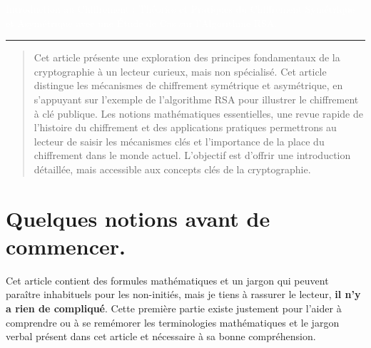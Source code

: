 \documentclass{article}
\author{
	Mathis Lefebvre \\
	\texttt{lefebvremathis@proton.me}\\ \vspace{60pt} 
	\today
	}
\makeatletter
\newenvironment{resume}{%
	\renewcommand{\abstractname}{Résumé}%
	\begin{abstract}
	}{%
	\end{abstract}
}
\def\printauthor{%
	{\large \@author}}
\makeatother
\begin{document}
	
	\begin{titlepage}
		\BgThispage
		\vspace*{2cm}
		\noindent
		\textcolor{white}{\huge Introduction au Chiffrement : Théories et Pratiques du Chiffrement
			Symétrique et Asymétrique avec une Étude de Cas sur l'Algorithme RSA.}
		\vspace*{2.5cm}\par
		\noindent
		\begin{minipage}{0.35\linewidth}
			\begin{flushright}
				\printauthor
			\end{flushright}
		\end{minipage} \hspace{15pt}
		\begin{minipage}{0.02\linewidth}
			\rule{1pt}{175pt}
		\end{minipage} \hspace{-10pt}
		\begin{minipage}{0.6\linewidth}
			\vspace{5pt}
			\begin{resume}
				Cet article présente une exploration des principes fondamentaux de la cryptographie à un lecteur curieux, mais non spécialisé. Cet article distingue les mécanismes de chiffrement symétrique et asymétrique, en s'appuyant sur l'exemple de l'algorithme RSA pour illustrer le chiffrement à clé publique. Les notions mathématiques essentielles, une revue rapide de l'histoire du chiffrement et des applications pratiques permettrons au lecteur de saisir les mécanismes clés et l'importance de la place du chiffrement dans le monde actuel. L'objectif est d'offrir une introduction détaillée, mais accessible aux concepts clés de la cryptographie.
			\end{resume}
		\end{minipage}
	\end{titlepage}
	
	
	\tableofcontents
	\newpage
	

\section{Quelques notions avant de commencer.}\label{notions.}

Cet article contient des formules mathématiques et un jargon qui peuvent
paraître inhabituels pour les non-initiés, mais je tiens à rassurer le lecteur, \textbf{il n'y a rien de compliqué}. 
Cette première partie existe justement pour l'aider à comprendre ou à se remémorer les
terminologies mathématiques et le jargon verbal présent dans cet article
et nécessaire à sa bonne compréhension.
\end{document}
